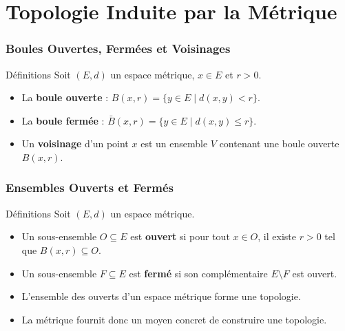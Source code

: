 \documentclass{beamer}
\begin{document}
\section*{Topologie Induite par la Métrique}
\begin{frame}
    \frametitle{Boules Ouvertes, Fermées et Voisinages}
    \begin{block}{Définitions}
        Soit $(E, d)$ un espace métrique, $x \in E$ et $r > 0$.
        \begin{itemize}
            \item La \textbf{boule ouverte} : $B(x, r) = \{y \in E \mid d(x, y) < r\}$.
            \item La \textbf{boule fermée} : $\bar{B}(x, r) = \{y \in E \mid d(x, y) \le r\}$.
            \item Un \textbf{voisinage} d'un point $x$ est un ensemble $V$ contenant une boule ouverte $B(x, r)$.
        \end{itemize}
    \end{block}
\end{frame}

\begin{frame}
    \frametitle{Ensembles Ouverts et Fermés}
    \begin{block}{Définitions}
        Soit $(E, d)$ un espace métrique.
        \begin{itemize}
            \item Un sous-ensemble $O \subseteq E$ est \textbf{ouvert} si pour tout $x \in O$, il existe $r > 0$ tel que $B(x, r) \subseteq O$.
            \item Un sous-ensemble $F \subseteq E$ est \textbf{fermé} si son complémentaire $E \setminus F$ est ouvert.
        \end{itemize}
    \end{block}
    \begin{itemize}
        \item L'ensemble des ouverts d'un espace métrique forme une topologie.
        \item La métrique fournit donc un moyen concret de construire une topologie.
    \end{itemize}
\end{frame}
\end{document}

